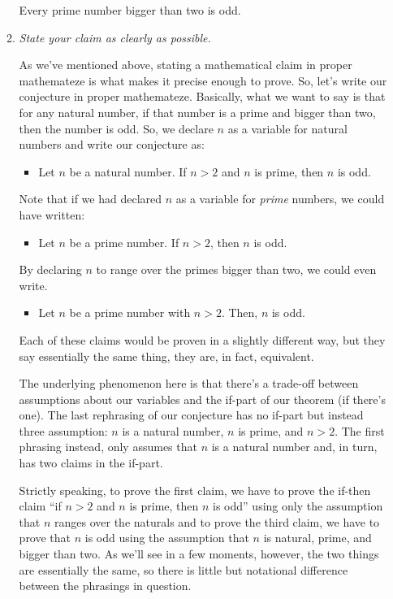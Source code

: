 \begin{enumerate}[{\thesection}.1]
\begin{enumerate}[\thesection.{7}.1]
				\begin{conjecture}
				Every prime number bigger than two is odd.
				\end{conjecture}
				
			\item \emph{State your claim as clearly as possible.}
									
			As we've mentioned above, stating a mathematical claim in proper mathemateze is what makes it precise enough to prove. So, let's write our conjecture in proper mathemateze. Basically, what we want to say is that for any natural number, if that number is a prime and bigger than two, then the number is odd. So, we declare $n$ as a variable for natural numbers and write our conjecture as:
			
			\begin{itemize}
			
				\item Let $n$ be a natural number. If $n>2$ and $n$ is prime, then $n$ is odd.
			
			\end{itemize} 
Note that if we had declared $n$ as a variable for \emph{prime} numbers, we could have written:
			\begin{itemize}
			
				\item Let $n$ be a prime number. If $n>2$, then $n$ is odd.
			
			\end{itemize}
By declaring $n$ to range over the primes bigger than two, we could even write.
			\begin{itemize}
			
				\item Let $n$ be a prime number with $n>2$. Then, $n$ is odd.
			
			\end{itemize}
Each of these claims would be proven in a slightly different way, but they say essentially the same thing, they are, in fact, equivalent.

The underlying phenomenon here is that there's a trade-off between assumptions about our variables and the if-part of our theorem (if there's one). The last rephrasing of our conjecture has no if-part but instead three assumption: $n$ is a natural number, $n$ is prime, and $n>2$. The first phrasing instead, only assumes that $n$ is a natural number and, in turn, has two claims in the if-part. 

Strictly speaking, to prove the first claim, we have to prove the if-then claim ``if $n>2$ and $n$ is prime, then $n$ is odd'' using only the assumption that $n$ ranges over the naturals and to prove the third claim, we have to prove that $n$ is odd using the assumption that $n$ is natural, prime, and bigger than two. As we'll see in a few moments, however, the two things are essentially the same, so there is little but notational difference between the phrasings in question.
														

\end{enumerate}
\end{enumerate}
